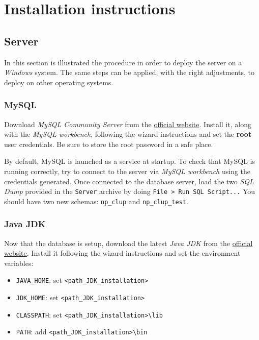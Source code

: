 \chapter{Installation instructions}
\section{Server}
In this section is illustrated the procedure in order to deploy the server on a \textit{Windows} system.\newline
The same steps can be applied, with the right adjustments, to deploy on other operating systems.

\subsection{MySQL}
Download \textit{MySQL Community Server} from the \href{https://dev.mysql.com/downloads/mysql/}{official website}.\newline
Install it, along with the \textit{MySQL workbench}, following the wizard instructions and set the \textbf{root} user credentials. Be sure to store the root password in a safe place.

By default, MySQL is launched as a service at startup.\newline
To check that MySQL is running correctly, try to connect to the server via \textit{MySQL workbench} using the credentials generated.\newline
Once connected to the database server, load the two \textit{SQL Dump} provided in the \verb|Server| archive by doing \verb|File > Run SQL Script...|\newline
You should have two new schemas: \verb|np_clup| and \verb|np_clup_test|.

\subsection{Java JDK}
Now that the database is setup, download the latest \textit{Java JDK} from the \href{https://www.oracle.com/it/java/technologies/javase-jdk15-downloads.html}{official website}.\newline
Install it following the wizard instructions and set the environment variables:
\begin{itemize}
	\item \verb|JAVA_HOME|: set \verb|<path_JDK_installation>|
	\item \verb|JDK_HOME|: set \verb|<path_JDK_installation>|
	\item \verb|CLASSPATH|: set \verb|<path_JDK_installation>\lib|
	\item \verb|PATH|: add \verb|<path_JDK_installation>\bin|
\end{itemize}
\clearpage
